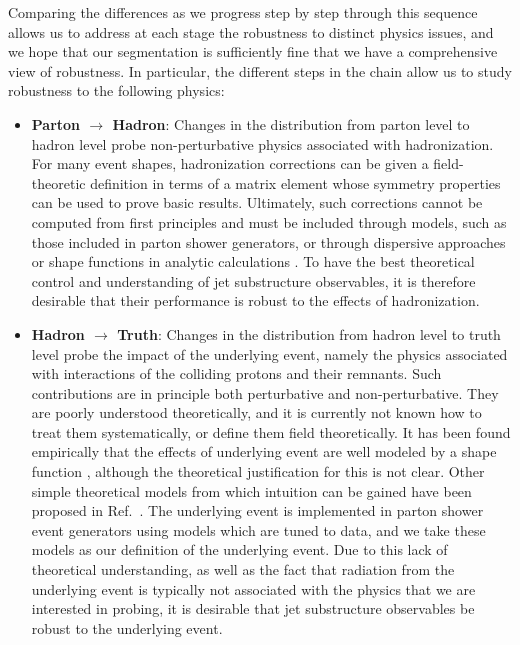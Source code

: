Comparing the differences as we progress step by step through this sequence allows us to address at each stage the robustness to distinct physics issues, and we hope that our segmentation is sufficiently fine that we have a comprehensive view of robustness.
%
In particular, the different steps in the chain allow us to study robustness to the following physics: 
%
\begin{itemize}
%
\item {\bf Parton $\to$ Hadron}: Changes in the distribution from parton
  level to hadron level probe non-perturbative physics associated with
  hadronization.
  For many event shapes, hadronization corrections can
  be given a field-theoretic definition in terms of a matrix element
  whose symmetry properties can be used to prove basic
  results.
  Ultimately, such corrections cannot be computed
  from first principles and must be included through models, such as
  those included in parton shower generators, or through dispersive approaches or shape
  functions in analytic calculations
  \cite{Dokshitzer:1995qm,Dokshitzer:1995zt,Korchemsky:1999kt,Korchemsky:2000kp,Bosch:2004th,Hoang:2007vb,Ligeti:2008ac}.
    To have the best theoretical
  control and understanding of jet substructure observables, it is
  therefore desirable that their performance is robust to the effects
  of hadronization.
\item {\bf Hadron $\to$ Truth}: Changes in the distribution from hadron level to truth level probe the impact of the underlying event, namely the physics associated with interactions of the colliding protons and their remnants.
%
Such contributions are in principle both perturbative and non-perturbative.
%
They are poorly understood theoretically, and it is currently not known how to treat them systematically, or define them field theoretically.
%
It has been found empirically that the effects of underlying event are well modeled by a shape function \cite{Stewart:2014nna}, although the theoretical justification for this is not clear. Other simple theoretical models from which intuition can be gained have been proposed in Ref.~\cite{Cacciari:2009dp}.
%
The underlying event is implemented in parton shower event generators using models which are tuned to data, and we take these models as our definition of the underlying event.
%
Due to this lack of theoretical understanding, as well as the fact that radiation from the underlying event is typically not associated with the physics that we are interested in probing, it is desirable that jet substructure observables be robust to the underlying event.

\end{itemize}
